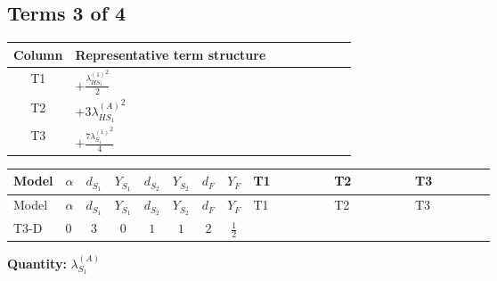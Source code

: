 \documentclass[8pt]{article}
\begin{document}
\begin{landscape}
\subsection*{Terms 3 of 4}
\begin{center}
\begin{tabular}{@{}c >{\raggedright\arraybackslash}p{0.82\linewidth}@{}}
\toprule
Column & Representative term structure \\
\midrule
T1 & \(\displaystyle +\frac{{\lambda_{HS_1}^{(1)}}^2}{2}\) \\
\midrule
T2 & \(\displaystyle +3 {\lambda_{HS_1}^{(A)}}^2\) \\
\midrule
T3 & \(\displaystyle +\frac{7 {\lambda_{S_1}^{(1)}}^2}{4}\) \\
\midrule
\bottomrule
\end{tabular}
\end{center}
\smallskip
\tiny
\begin{longtable}{@{}llcccccc >{\raggedright\arraybackslash}p{0.21\linewidth} >{\raggedright\arraybackslash}p{0.21\linewidth} >{\raggedright\arraybackslash}p{0.21\linewidth}@{}}
\toprule
Model & $\alpha$ & $d_{S_1}$ & $Y_{S_1}$ & $d_{S_2}$ & $Y_{S_2}$ & $d_F$ & $Y_F$ & T1 & T2 & T3 \\
\midrule
\endfirsthead
\toprule
Model & $\alpha$ & $d_{S_1}$ & $Y_{S_1}$ & $d_{S_2}$ & $Y_{S_2}$ & $d_F$ & $Y_F$ & T1 & T2 & T3 \\
\midrule
\endhead
T3-D & $0$ & $3$ & $0$ & $1$ & $1$ & $2$ & $\frac{1}{2}$ & \scriptsize\adjustbox{max width=\linewidth}{$\begin{gathered} +\frac{{\lambda_{HS_1}^{(1)}}^2}{2}\end{gathered}$} & \scriptsize\adjustbox{max width=\linewidth}{$\begin{gathered} +3 {\lambda_{HS_1}^{(A)}}^2\end{gathered}$} & \scriptsize\adjustbox{max width=\linewidth}{$\begin{gathered} +\frac{7 {\lambda_{S_1}^{(1)}}^2}{4}\end{gathered}$} \\
\midrule
\bottomrule
\end{longtable}
\clearpage
\noindent\textbf{Quantity: }$\lambda_{S_1}^{(A)}$\par\smallskip

\end{landscape}
\end{document}
